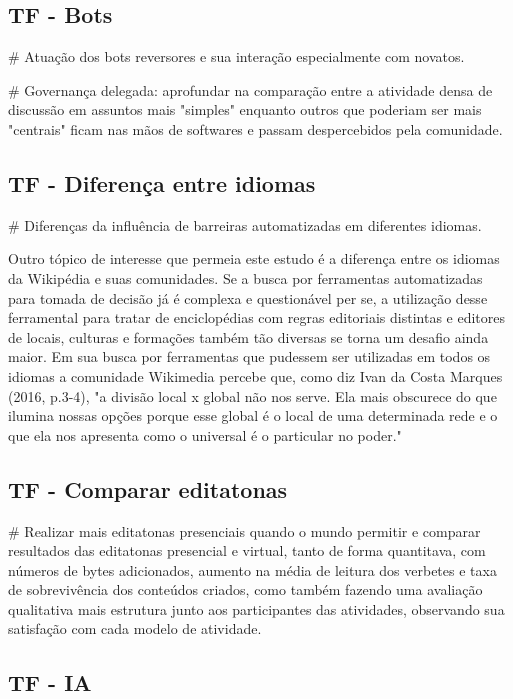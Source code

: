 \subsection{TF - Bots}

# Atuação dos bots reversores e sua interação especialmente com novatos.

# Governança delegada: aprofundar na comparação entre a atividade densa de discussão em assuntos mais "simples" enquanto outros que poderiam ser mais "centrais" ficam nas mãos de softwares e passam despercebidos pela comunidade.

\subsection{TF - Diferença entre idiomas}

# Diferenças da influência de barreiras automatizadas em diferentes idiomas.

Outro tópico de interesse que permeia este estudo é a diferença entre os idiomas da Wikipédia e suas comunidades. Se a busca por ferramentas automatizadas para tomada de decisão já é complexa e questionável per se, a utilização desse ferramental para tratar de enciclopédias com regras editoriais distintas e editores de locais, culturas e formações também tão diversas se torna um desafio ainda maior. Em sua busca por ferramentas que pudessem ser utilizadas em todos os idiomas a comunidade Wikimedia percebe que, como diz Ivan da Costa Marques (2016, p.3-4), "a divisão local x global não nos serve. Ela mais obscurece do que ilumina nossas opções porque esse global é o local de uma determinada rede e o que ela nos apresenta como o universal é o particular no poder."

\subsection{TF - Comparar editatonas}

# Realizar mais editatonas presenciais quando o mundo permitir e comparar resultados das editatonas presencial e virtual, tanto de forma quantitava, com números de bytes adicionados, aumento na média de leitura dos verbetes e taxa de sobrevivência dos conteúdos criados, como também fazendo uma avaliação qualitativa mais estrutura junto aos participantes das atividades, observando sua satisfação com cada modelo de atividade.

\subsection{TF - IA}

